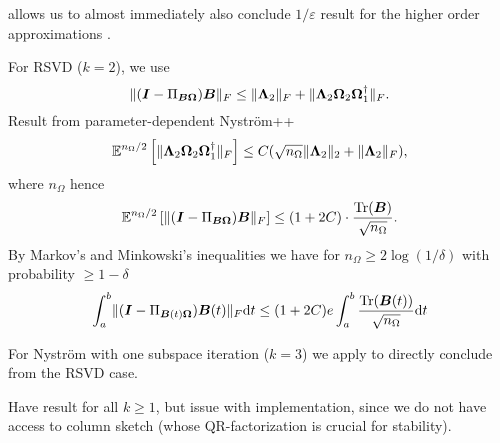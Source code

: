  allows us to almost immediately
also conclude $1/\varepsilon$ result for the higher order approximations
.

For RSVD ($k=2$), we use \cite[theorem~9.1]{halko2011finding}
\begin{equation}
    \lVert (\boldsymbol{I} - \Pi_{\boldsymbol{B}\boldsymbol{\Omega}}) \boldsymbol{B} \rVert _F \leq \lVert \boldsymbol{\Lambda}_2 \rVert _F + \lVert \boldsymbol{\Lambda}_2 \boldsymbol{\Omega}_2 \boldsymbol{\Omega}_1^{\dagger} \rVert _F.
\end{equation}
Result from parameter-dependent Nyström++ 
\begin{equation}
    \mathbb{E}^{n_{\Omega}/2} \left[ \lVert \mtx{\Lambda}_2 \mtx{\Omega}_2 \mtx{\Omega}_1^{\dagger} \rVert _F \right] \leq C(\sqrt{n_{\Omega}} \lVert \mtx{\Lambda}_2 \rVert _2 + \lVert \mtx{\Lambda}_2 \rVert _F),%
\end{equation}
where $n_{\Omega}$ hence
\begin{equation}
    \mathbb{E}^{n_{\Omega}/2} \left[ \lVert (\boldsymbol{I} - \Pi_{\boldsymbol{B}\boldsymbol{\Omega}}) \boldsymbol{B} \rVert _F \right]
    \leq (1 + 2C) \cdot \frac{\operatorname{Tr}(\boldsymbol{B})}{\sqrt{n_{\Omega}}}.
\end{equation}
By Markov's and Minkowski's inequalities we have for $n_{\Omega} \geq 2 \log(1/\delta)$ with probability $\geq 1 - \delta$
\begin{equation}
    \int_{a}^{b}\lVert  (\boldsymbol{I} - \Pi_{\boldsymbol{B}(t)\boldsymbol{\Omega}}) \boldsymbol{B}(t) \rVert _F \mathrm{d}t \leq (1 + 2C) e \int_{a}^{b}\frac{\operatorname{Tr}(\boldsymbol{B}(t))}{\sqrt{n_{\Omega}}} \mathrm{d}t
\end{equation}

For Nystr\"om with one subspace iteration ($k=3$) we apply \cite[lemma~5.2]{tropp2023randomized}
to directly conclude from the RSVD case.

Have result for all $k \geq 1$, but issue with implementation, since we do not
have access to column sketch (whose QR-factorization is crucial for stability).

